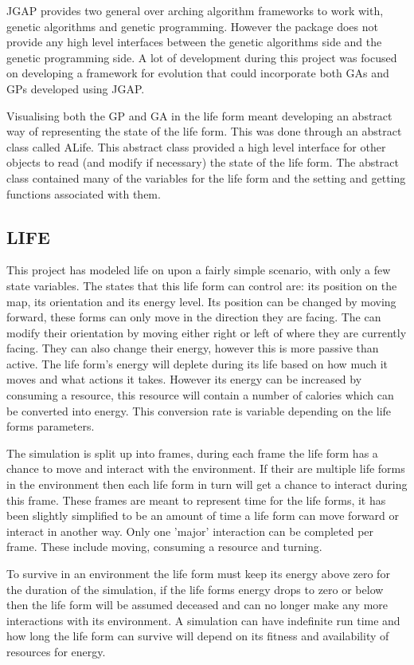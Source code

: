 \documentclass[10pt,twocolumn]{article}
\begin{document}
JGAP provides two general over arching algorithm frameworks to work with, genetic algorithms and genetic programming. However
the package does not provide any high level interfaces between the genetic algorithms side and the genetic programming side. A 
lot of development during this project was focused on developing a framework for evolution that could incorporate both GAs and GPs developed
using JGAP. 

Visualising both the GP and GA in the life form meant developing an abstract way of representing the state of the life form. This was done
through an abstract class called ALife. This abstract class provided a high level interface for other objects to read (and modify if necessary)
the state of the life form. The abstract class contained many of the variables for the life form and the setting and getting functions 
associated with them. 

\subsection{LIFE}

This project has modeled life on upon a fairly simple scenario, with only a few state variables. The states that this life form
can control are: its position on the map, its orientation and its energy level. Its position can be changed by moving forward, these 
forms can only move in the direction they are facing. The can modify their orientation by moving either right or left of where they 
are currently facing. They can also change their energy, however this is more passive than active. The life form's energy will
deplete during its life based on how much it moves and what actions it takes. However its energy can be increased by consuming a 
resource, this resource will contain a number of calories which can be converted into energy. This conversion rate is variable
depending on the life forms parameters. 

The simulation is split up into frames, during each frame the life form has a chance to move and interact with the environment. If their
are multiple life forms in the environment then each life form in turn will get a chance to interact during this frame. These frames are
meant to represent time for the life forms, it has been slightly simplified to be an amount of time a life form can move forward or interact in another way. Only one 'major' interaction can be completed per frame. These include moving, consuming a resource and turning.

To survive in an environment the life form must keep its energy above zero for the duration of the simulation, if the life forms energy
drops to zero or below then the life form will be assumed deceased and can no longer make any more interactions with its environment. A simulation can have indefinite run time and how long the life form can survive will depend on its fitness and availability of resources for energy.
\end{document}
